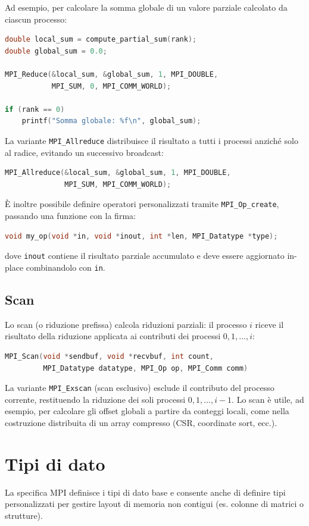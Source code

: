 Ad esempio, per calcolare la somma globale di un valore parziale calcolato da ciascun processo:
\begin{lstlisting}[language=C, numbers=none]
double local_sum = compute_partial_sum(rank);
double global_sum = 0.0;

MPI_Reduce(&local_sum, &global_sum, 1, MPI_DOUBLE,
           MPI_SUM, 0, MPI_COMM_WORLD);

if (rank == 0)
    printf("Somma globale: %f\n", global_sum);
\end{lstlisting}
La variante \texttt{MPI\_Allreduce} distribuisce il risultato a tutti i processi anziché solo al radice, evitando un successivo broadcast:
\begin{lstlisting}[language=C, numbers=none]
MPI_Allreduce(&local_sum, &global_sum, 1, MPI_DOUBLE,
              MPI_SUM, MPI_COMM_WORLD);
\end{lstlisting}
È inoltre possibile definire operatori personalizzati tramite \texttt{MPI\_Op\_create}, passando una funzione con la firma:
\begin{lstlisting}[language=C, numbers=none]
void my_op(void *in, void *inout, int *len, MPI_Datatype *type);
\end{lstlisting}
dove \texttt{inout} contiene il risultato parziale accumulato e deve essere aggiornato in-place combinandolo con \texttt{in}.

\subsection{Scan}
Lo scan (o riduzione prefissa) calcola riduzioni parziali: il processo \(i\) riceve il risultato della riduzione applicata ai contributi dei processi \(0, 1, \ldots, i\):
\begin{lstlisting}[language=C, numbers=none]
MPI_Scan(void *sendbuf, void *recvbuf, int count,
         MPI_Datatype datatype, MPI_Op op, MPI_Comm comm)
\end{lstlisting}
La variante \texttt{MPI\_Exscan} (scan esclusivo) esclude il contributo del processo corrente, restituendo la riduzione dei soli processi \(0, 1, \ldots, i-1\). Lo scan è utile, ad esempio, per calcolare gli offset globali a partire da conteggi locali, come nella costruzione distribuita di un array compresso (CSR, coordinate sort, ecc.).

\section{Tipi di dato}
La specifica MPI definisce i tipi di dato base e consente anche di definire tipi personalizzati per gestire layout di memoria non contigui (es. colonne di matrici o strutture).

